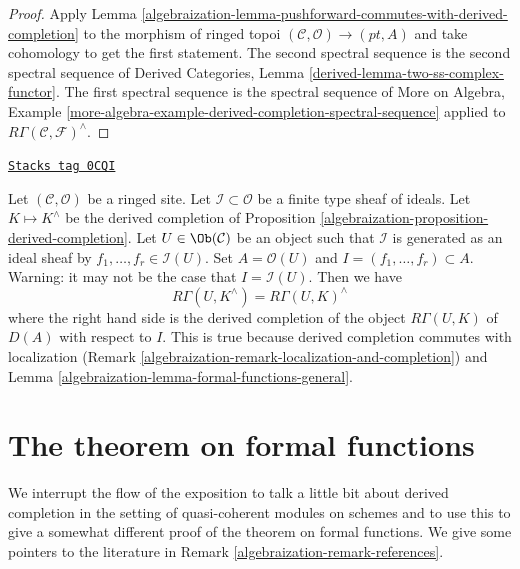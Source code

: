 \begin{proof}

Apply Lemma \ref{algebraization-lemma-pushforward-commutes-with-derived-completion}
to the morphism of ringed topoi $(\mathcal{C}, \mathcal{O}) \to (pt, A)$
and take cohomology to get the first statement. The second spectral sequence
is the second spectral sequence of
Derived Categories, Lemma \ref{derived-lemma-two-ss-complex-functor}.
The first spectral sequence is the spectral sequence of
More on Algebra, Example
\ref{more-algebra-example-derived-completion-spectral-sequence}
applied to $R\Gamma(\mathcal{C}, \mathcal{F})^\wedge$.
\end{proof}

\begin{remark}
\label{algebraization-remark-local-calculation-derived-completion}
\href{https://stacks.math.columbia.edu/tag/0CQI}{\texttt{Stacks tag 0CQI}}

Let $(\mathcal{C}, \mathcal{O})$ be a ringed site.
Let $\mathcal{I} \subset \mathcal{O}$ be a finite type sheaf of
ideals. Let $K \mapsto K^\wedge$ be the derived completion of
Proposition \ref{algebraization-proposition-derived-completion}.
Let $U \in \Ob(\mathcal{C})$ be an object such that $\mathcal{I}$
is generated as an ideal sheaf by $f_1, \ldots, f_r \in \mathcal{I}(U)$.
Set $A = \mathcal{O}(U)$ and $I = (f_1, \ldots, f_r) \subset A$.
Warning: it may not be the case that $I = \mathcal{I}(U)$.
Then we have
$$
R\Gamma(U, K^\wedge) = R\Gamma(U, K)^\wedge
$$
where the right hand side is the derived completion of
the object $R\Gamma(U, K)$ of $D(A)$ with respect to $I$.
This is true because derived completion commutes with localization
(Remark \ref{algebraization-remark-localization-and-completion}) and
Lemma \ref{algebraization-lemma-formal-functions-general}.
\end{remark}

\section{The theorem on formal functions}
\label{algebraization-section-formal-functions}
We interrupt the flow of the exposition to talk a little bit about
derived completion in the setting of quasi-coherent modules on schemes
and to use this to give a somewhat different proof of the theorem on
formal functions. We give some pointers to the literature in
Remark \ref{algebraization-remark-references}.

